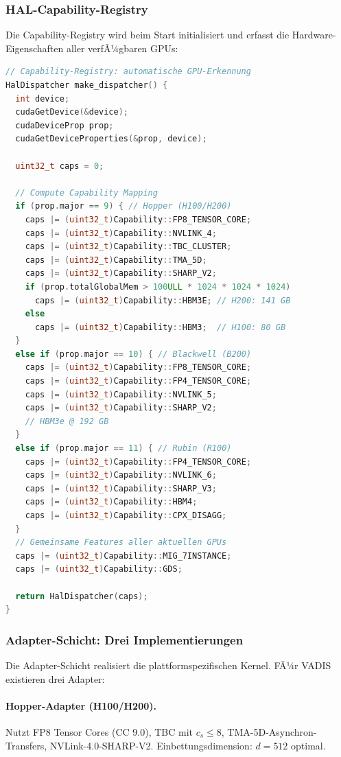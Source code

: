 ﻿\documentclass[12pt,a4paper]{article}
\begin{document}
\subsubsection{HAL-Capability-Registry}

Die Capability-Registry wird beim Start initialisiert
und erfasst die Hardware-Eigenschaften aller verfÃ¼gbaren GPUs:

\begin{lstlisting}[language=C++, caption={Capability-Registry Initialisierung}]
// Capability-Registry: automatische GPU-Erkennung
HalDispatcher make_dispatcher() {
  int device;
  cudaGetDevice(&device);
  cudaDeviceProp prop;
  cudaGetDeviceProperties(&prop, device);
  
  uint32_t caps = 0;
  
  // Compute Capability Mapping
  if (prop.major == 9) { // Hopper (H100/H200)
    caps |= (uint32_t)Capability::FP8_TENSOR_CORE;
    caps |= (uint32_t)Capability::NVLINK_4;
    caps |= (uint32_t)Capability::TBC_CLUSTER;
    caps |= (uint32_t)Capability::TMA_5D;
    caps |= (uint32_t)Capability::SHARP_V2;
    if (prop.totalGlobalMem > 100ULL * 1024 * 1024 * 1024)
      caps |= (uint32_t)Capability::HBM3E; // H200: 141 GB
    else
      caps |= (uint32_t)Capability::HBM3;  // H100: 80 GB
  }
  else if (prop.major == 10) { // Blackwell (B200)
    caps |= (uint32_t)Capability::FP8_TENSOR_CORE;
    caps |= (uint32_t)Capability::FP4_TENSOR_CORE;
    caps |= (uint32_t)Capability::NVLINK_5;
    caps |= (uint32_t)Capability::SHARP_V2;
    // HBM3e @ 192 GB
  }
  else if (prop.major == 11) { // Rubin (R100)
    caps |= (uint32_t)Capability::FP4_TENSOR_CORE;
    caps |= (uint32_t)Capability::NVLINK_6;
    caps |= (uint32_t)Capability::SHARP_V3;
    caps |= (uint32_t)Capability::HBM4;
    caps |= (uint32_t)Capability::CPX_DISAGG;
  }
  // Gemeinsame Features aller aktuellen GPUs
  caps |= (uint32_t)Capability::MIG_7INSTANCE;
  caps |= (uint32_t)Capability::GDS;
  
  return HalDispatcher(caps);
}
\end{lstlisting}

\subsubsection{Adapter-Schicht: Drei Implementierungen}

Die Adapter-Schicht realisiert die plattformspezifischen Kernel.
FÃ¼r VADIS existieren drei Adapter:

\paragraph{Hopper-Adapter (H100/H200).}
Nutzt FP8 Tensor Cores (CC 9.0), TBC mit $c_s \leq 8$,
TMA-5D-Asynchron-Transfers, NVLink-4.0-SHARP-V2.
Einbettungsdimension: $d = 512$ optimal.
\end{document}
